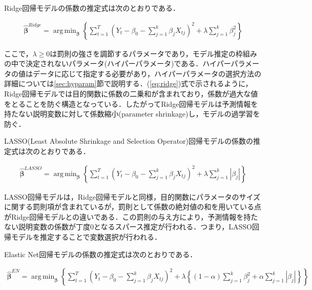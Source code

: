 \documentclass[a4paper，12pt]{jsarticle}
\DeclareMathOperator*{\argmin}{arg\,min}
\begin{document}
Ridge回帰モデルの係数の推定式は次のとおりである．

\begin{equation} \label{eq:ridge}
  \begin{split}
    \hat{\bm{\beta}}^{Ridge} = \argmin_{\bm{\beta}}\left\{ \sum_{t=1}^{T} \left( Y_t - \beta_0 - \sum_{j=1}^{k} \beta_{j} X_{tj} \right)^2 + \lambda \sum_{j=1}^{k} \beta_{j}^{2} \right\}
  \end{split}
\end{equation}

ここで，$\lambda \geq 0$は罰則の強さを調節するパラメータであり，モデル推定の枠組みの中で決定されないパラメータ(ハイパーパラメータ)である．ハイパーパラメータの値はデータに応じて指定する必要があり，ハイパーパラメータの選択方法の詳細については\ref{sec:hyparam}節で説明する．(\ref{eq:ridge})式で示されるように，Ridge回帰モデルでは目的関数に係数の二乗和が含まれており，係数が過大な値をとることを防ぐ構造となっている．したがってRidge回帰モデルは予測情報を持たない説明変数に対して係数縮小(parameter shrinkage)し，モデルの過学習を防ぐ．

LASSO(Least Absolute Shrinkage and Selection Operator)回帰モデルの係数の推定式は次のとおりである．

\begin{equation} \label{eq:lasso}
  \begin{split}
    \hat{\bm{\beta}}^{LASSO} = \argmin_{\bm{\beta}}\left\{ \sum_{t=1}^{T} \left( Y_t - \beta_0 - \sum_{j=1}^{k} \beta_{j} X_{tj} \right)^2 + \lambda \sum_{j=1}^{k} \left|\beta_{j}\right| \right\}
  \end{split}
\end{equation}

LASSO回帰モデルは，Ridge回帰モデルと同様，目的関数にパラメータのサイズに関する罰則項が含まれているが，罰則として係数の絶対値の和を用いている点がRidge回帰モデルとの違いである．この罰則の与え方により，予測情報を持たない説明変数の係数が丁度0となるスパース推定が行われる．つまり，LASSO回帰モデルを推定することで変数選択が行われる．

Elastic Net回帰モデルの係数の推定式は次のとおりである．

\begin{equation}
  \begin{split}
    \hat{\bm{\beta}}^{EN} = \argmin_{\bm{\beta}}\left\{ \sum_{t=1}^{T} \left( Y_t - \beta_0 - \sum_{j=1}^{k} \beta_{j} X_{tj} \right)^2 + 
    \lambda \left\{ 
      \left( 1 - \alpha \right) \sum_{j=1}^{k} \beta_{j}^2 + 
      \alpha \sum_{j=1}^{k} \left|\beta_{j}\right| 
      \right\} 
    \right\}
  \end{split}
\end{equation}
\end{document}
